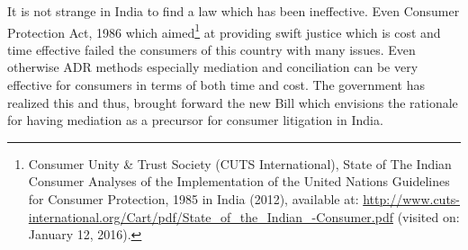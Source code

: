 \begin{multicols}{2}
\noi
It is not strange in India to find a law which has been ineffective. Even Consumer Protection
Act, 1986 which aimed\footnote{Consumer Unity \& Trust Society (CUTS International), State of The Indian Consumer Analyses of the Implementation of the United Nations Guidelines for Consumer Protection, 1985 in India (2012), available at: \url{http://www.cuts-international.org/Cart/pdf/State_of_the_Indian_-Consumer.pdf} (visited on: January 12, 2016).} at providing swift justice which is cost and time effective failed the
consumers of this country with many issues. Even otherwise ADR methods especially
mediation and conciliation can be very effective for consumers in terms of both time and cost.
The government has realized this and thus, brought forward the new Bill which envisions the
rationale for having mediation as a precursor for consumer litigation in India.
\end{multicols}
	
